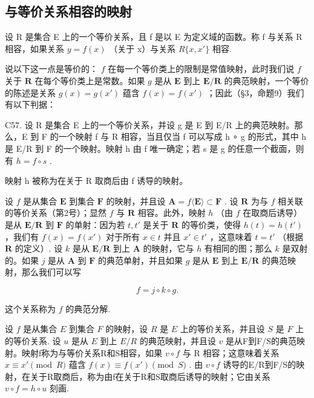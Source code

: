 \subsection{与等价关系相容的映射}

设 R 是集合 E 上的一个等价关系，且 f 是以 E 为定义域的函数。称 f 与关系 R 相容，如果关系 \(y = f(x)\) （关于 x）与关系 \(R\{x, x'\}\) 相容.

说以下这一点是等价的： \(f\) 在每一个等价类上的限制是常值映射，此时我们说 \(f\) 关于 \(\mathbf{R}\) 在每个等价类上是常数。如果 \(g\) 是从 \(\mathbf{E}\) 到上 \(\mathbf{E} / \mathbf{R}\) 的典范映射，一个等价的陈述是关系 \(g(x) = g(x')\) 蕴含 \(f(x) = f(x')\) ；因此（§3，命题9）我们有以下判据：

C57. 设 R 是集合 E 上的一个等价关系，并设 g 是 E 到 E/R 上的典范映射。那么，E 到 F 的一个映射 f 与 R 相容，当且仅当 f 可以写成 h ∘ g 的形式，其中 h 是 E/R 到 F 的一个映射。映射 h 由 f 唯一确定；若 s 是 g 的任意一个截面，则有 \(h = f \circ s\) .

映射 h 被称为在关于 R 取商后由 f 诱导的映射。

设 \(f\) 是从集合 \(\mathbf{E}\) 到集合 \(\mathbf{F}\) 的映射，并且设 \(\mathbf{A} = f\langle \mathbf{E}\rangle \subset \mathbf{F}\) . 设 \(\mathbf{R}\) 为与 \(f\) 相关联的等价关系（第2号）；显然 \(f\) 与 \(\mathbf{R}\) 相容。此外，映射 \(h\) （由 \(f\) 在取商后诱导）是从 \(\mathbf{E} / \mathbf{R}\) 到 \(\mathbf{F}\) 的单射：因为若 \(t, t'\) 是关于 \(\mathbf{R}\) 的等价类，使得 \(h(t) = h(t')\) ，我们有 \(f(x) = f(x')\) 对于所有 \(x \in t\) 并且 \(x' \in t'\) ，这意味着 \(t = t'\) （根据 \(\mathbf{R}\) 的定义）. 设 \(k\) 是从 \(\mathbf{E} / \mathbf{R}\) 到上 \(\mathbf{A}\) 的映射，它与 \(h\) 有相同的图；那么 \(k\) 是双射的。如果 \(j\) 是从 \(\mathbf{A}\) 到 \(\mathbf{F}\) 的典范单射，并且如果 \(g\) 是从 \(\mathbf{E}\) 到上 \(\mathbf{E} / \mathbf{R}\) 的典范映射，那么我们可以写

\[
f = j \circ k \circ g.
\]

这个关系称为 \(f\) 的典范分解.

设 \(f\) 是从集合 \(E\) 到集合 \(F\) 的映射，设 \(R\) 是 \(E\) 上的等价关系，并且设 \(S\) 是 \(F\) 上的等价关系. 设 \(u\) 是从 \(E\) 到上 \(E / R\) 的典范映射，并且设 \(v\) 是从F到F/S的典范映射。映射f称为与等价关系R和S相容，如果 \(v \circ f\) 与 R 相容；这意味着关系 \(x \equiv x' \pmod{R}\) 蕴含 \(f(x) \equiv f(x') \pmod{S}\) . 由 \(v \circ f\) 诱导的E/R到F/S的映射，在关于R取商后，称为由f在关于R和S取商后诱导的映射；它由关系 \(v \circ f = h \circ u\) 刻画.


